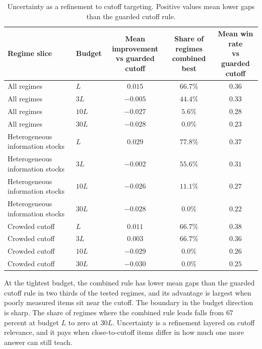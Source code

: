 \documentclass[11pt]{article}
\theoremstyle{definition}
\theoremstyle{remark}
\newcommand{\1}{\mathbf{1}}
\begin{document}
\begin{table}[h!]
\centering
\scriptsize
\setlength{\tabcolsep}{4pt}
\begin{tabular}{llccc}
\toprule
Regime slice & Budget & \shortstack{Mean improvement\\vs guarded cutoff} & \shortstack{Share of regimes\\combined best} & \shortstack{Mean win rate\\vs guarded cutoff} \\
\midrule
All regimes & \(L\)   & $0.015$  & $66.7\%$ & $0.36$ \\
All regimes & \(3L\)  & $-0.005$ & $44.4\%$ & $0.33$ \\
All regimes & \(10L\) & $-0.027$ & $5.6\%$  & $0.28$ \\
All regimes & \(30L\) & $-0.028$ & $0.0\%$  & $0.23$ \\
\midrule
Heterogeneous information stocks & \(L\)   & $0.029$  & $77.8\%$ & $0.37$ \\
Heterogeneous information stocks & \(3L\)  & $-0.002$ & $55.6\%$ & $0.31$ \\
Heterogeneous information stocks & \(10L\) & $-0.026$ & $11.1\%$ & $0.27$ \\
Heterogeneous information stocks & \(30L\) & $-0.028$ & $0.0\%$  & $0.22$ \\
\midrule
Crowded cutoff & \(L\)   & $0.011$  & $66.7\%$ & $0.38$ \\
Crowded cutoff & \(3L\)  & $0.003$  & $66.7\%$ & $0.36$ \\
Crowded cutoff & \(10L\) & $-0.029$ & $0.0\%$  & $0.26$ \\
Crowded cutoff & \(30L\) & $-0.030$ & $0.0\%$  & $0.25$ \\
\bottomrule
\end{tabular}
\caption{Uncertainty as a refinement to cutoff targeting. Positive values mean lower gaps than the guarded cutoff rule.}
\label{tab:combined-regime-map}
\end{table}

At the tightest budget, the combined rule has lower mean gaps than
the guarded cutoff rule in two thirds of the tested regimes, and its advantage is
largest when poorly measured items sit near the cutoff. The boundary in
the budget direction is sharp. The share of regimes where the combined
rule leads falls from \(67\) percent at budget \(L\) to zero at
\(30L\). Uncertainty is a refinement layered on cutoff relevance, and
it pays when close-to-cutoff items differ in how much one more answer
can still teach.
\end{document}
